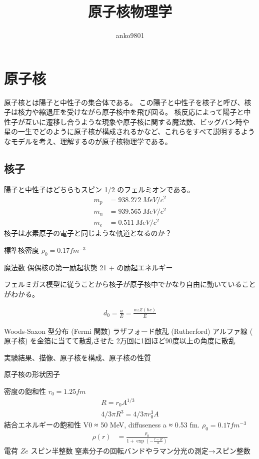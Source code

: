 \documentclass[uplatex,dvipdfmx,a4paper,11pt]{jlreq}
\title{原子核物理学}
\author{anko9801}
\numberwithin{equation}{section}
\theoremstyle{definition}
\begin{document}
\maketitle
\tableofcontents
\clearpage

\section{原子核}
原子核とは陽子と中性子の集合体である。
この陽子と中性子を核子と呼び、核子は核力や縮退圧を受けながら原子核中を飛び回る。
核反応によって陽子と中性子が互いに遷移し合うような現象や原子核に関する魔法数、ビッグバン時や星の一生でどのように原子核が構成されるかなど、これらをすべて説明するようなモデルを考え、理解するのが原子核物理学である。

\subsection{核子}
陽子と中性子はどちらもスピン 1/2 のフェルミオンである。
\begin{align}
  m_p & = 938.272\ \si{MeV/c^2} \\
  m_n & = 939.565\ \si{MeV/c^2} \\
  m_e & = 0.511\ \si{MeV/c^2}
\end{align}
核子は水素原子の電子と同じような軌道となるのか？

標準核密度 $\rho_0 = 0.17 \si{fm^{-3}}$

魔法数
偶偶核の第一励起状態 21 + の励起エネルギー

フェルミガス模型に従うことから核子が原子核中でかなり自由に動いていることがわかる。


\begin{align}
  d_0 = \frac{a}{E} = \frac{\alpha z Z(\hbar c)}{E}
\end{align}

Woods-Saxon 型分布 (Fermi 関数)
ラザフォード散乱 (Rutherford)
アルファ線 ( 原子核) を金箔に当てて散乱させた
2万回に1回ほど90度以上の角度に散乱



実験結果、描像、原子核を構成、原子核の性質

原子核の形状因子

密度の飽和性
$r_0 = 1.25 \si{fm}$
\begin{align}
  R = r_0A^{1/3} \\
  4/3\pi R^3 = 4/3\pi r_0^3A
\end{align}
結合エネルギーの飽和性
V0 ≈ 50 MeV,
diffuseness a ≈ 0.53 \si{fm}.
$\rho_0 = 0.17 \si{fm^{-3}}$
\begin{align}
  \rho(r) & = \frac{\rho_0}{1 + \exp(-\frac{r - R}{a})}
\end{align}
電荷 $Ze$
スピン半整数
窒素分子の回転バンドやラマン分光の測定→スピン整数
\end{document}
